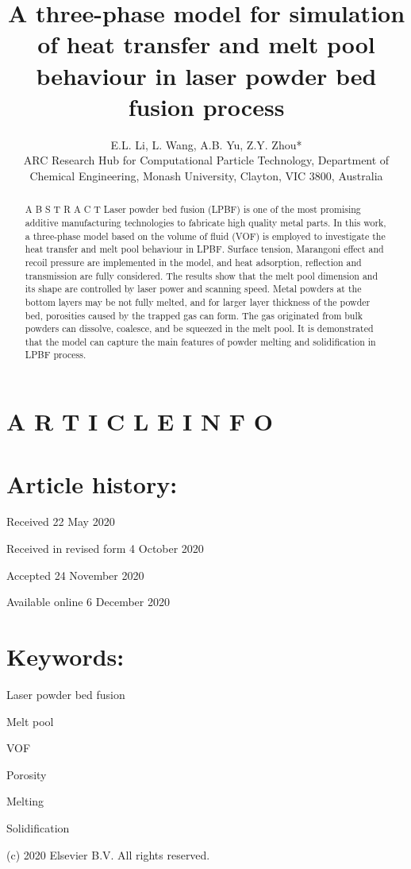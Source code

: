 \documentclass[10pt]{article}
\title{A three-phase model for simulation of heat transfer and melt pool behaviour in laser powder bed fusion process }
\author{E.L. Li, L. Wang, A.B. Yu, Z.Y. Zhou*\\
ARC Research Hub for Computational Particle Technology, Department of Chemical Engineering, Monash University, Clayton, VIC 3800, Australia}
\date{}
\begin{document}
\maketitle


\section*{A R T I C L E I N F O}
\section*{Article history:}
Received 22 May 2020

Received in revised form 4 October 2020

Accepted 24 November 2020

Available online 6 December 2020

\section*{Keywords:}
Laser powder bed fusion

Melt pool

VOF

Porosity

Melting

Solidification

\begin{abstract}
A B S T R A C T Laser powder bed fusion (LPBF) is one of the most promising additive manufacturing technologies to fabricate high quality metal parts. In this work, a three-phase model based on the volume of fluid (VOF) is employed to investigate the heat transfer and melt pool behaviour in LPBF. Surface tension, Marangoni effect and recoil pressure are implemented in the model, and heat adsorption, reflection and transmission are fully considered. The results show that the melt pool dimension and its shape are controlled by laser power and scanning speed. Metal powders at the bottom layers may be not fully melted, and for larger layer thickness of the powder bed, porosities caused by the trapped gas can form. The gas originated from bulk powders can dissolve, coalesce, and be squeezed in the melt pool. It is demonstrated that the model can capture the main features of powder melting and solidification in LPBF process.
\end{abstract}

(c) 2020 Elsevier B.V. All rights reserved.
\end{document}
